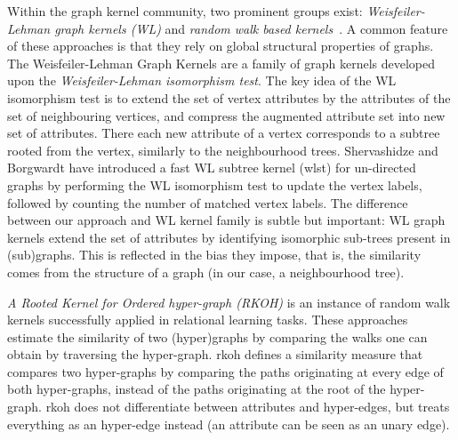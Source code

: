 Within the graph kernel community, two prominent groups exist:  \textit{Weisfeiler-Lehman graph kernels (WL)} \cite{Shervashidze2011,shervashidze09fastsubtree,FrasconiCRG14,haussler99convolution,ICPR2014BaiRH}  and \textit{random walk based kernels}~\cite{WachmanK07,Lovasz1996}.
A common feature of these approaches is that they rely on global structural properties of graphs.
The Weisfeiler-Lehman Graph Kernels are a family of graph kernels developed upon the \textit{Weisfeiler-Lehman isomorphism test}.
The key idea of the WL isomorphism test is to extend the set of vertex attributes by the attributes of the set of neighbouring vertices, and compress the augmented attribute set into new set of attributes.
There each new attribute of a vertex corresponds to a subtree rooted from the vertex, similarly to the neighbourhood trees.
Shervashidze and Borgwardt have introduced a fast WL subtree kernel (\gls{wlst}) \cite{shervashidze09fastsubtree} for un-directed graphs by performing the WL isomorphism test to update the vertex labels, followed by counting the number of matched vertex labels.
The difference between our approach and WL kernel family is subtle but important: WL graph kernels extend the set of attributes by identifying isomorphic sub-trees present in (sub)graphs.
This is reflected in the bias they impose, that is, the similarity comes from the structure of a graph (in our case, a neighbourhood tree).


\textit{A Rooted Kernel for Ordered hyper-graph (RKOH)} \cite{WachmanK07} is an instance of random walk kernels successfully applied in relational learning tasks.
These approaches estimate the similarity of two (hyper)graphs by comparing the walks one can obtain by traversing the hyper-graph.
\gls{rkoh} defines a similarity measure that compares two hyper-graphs by comparing the paths originating at every edge of both hyper-graphs, instead of the paths originating at the root of the hyper-graph.
\gls{rkoh} does not differentiate between attributes and hyper-edges, but treats everything as an hyper-edge instead (an attribute can be seen as an unary edge).


